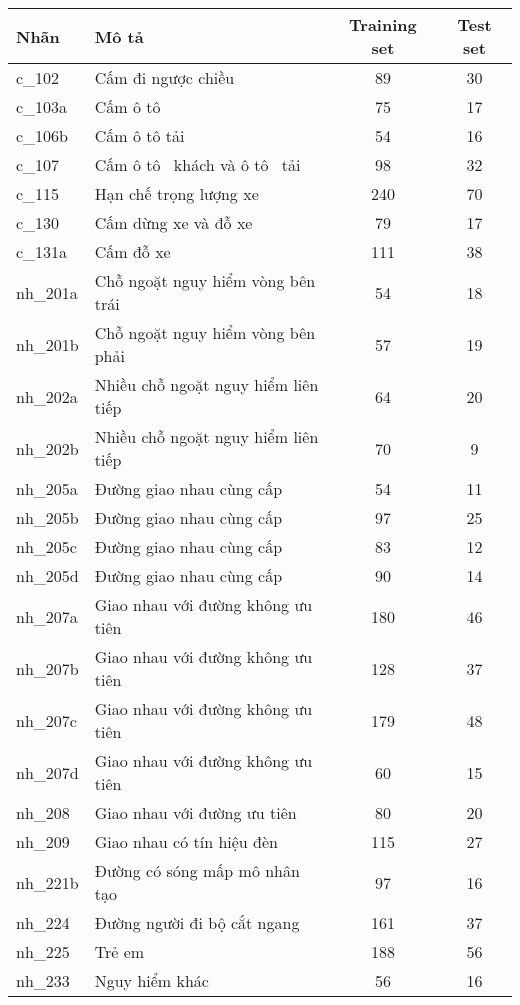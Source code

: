 \documentclass[../thesis.tex]{subfiles}
\begin{document}
\begin{table}[!htb]
\begin{longtable}{| l | l | c | c |}
	\hline
	Nhãn & Mô tả & Training set & Test set\\
	\hline
	c\_102 & Cấm đi ngược chiều & 89 & 30\\
	\hline
	c\_103a & Cấm ô tô & 75 & 17\\
	\hline
	c\_106b & Cấm ô tô tải & 54 & 16\\
	\hline
	c\_107 & Cấm ô tô  khách và ô tô  tải & 98 & 32\\
	\hline
	c\_115 & Hạn chế trọng lượng xe & 240 & 70\\
	\hline
	c\_130 & Cấm dừng xe và đỗ xe & 79 & 17\\
	\hline
	c\_131a & Cấm đỗ xe & 111 & 38\\
	\hline
	nh\_201a & Chỗ ngoặt nguy hiểm vòng bên trái & 54 & 18\\
	\hline
	nh\_201b & Chỗ ngoặt nguy hiểm vòng bên phải & 57 & 19\\
	\hline
	nh\_202a & Nhiều chỗ ngoặt nguy hiểm liên tiếp & 64 & 20\\
	\hline
	nh\_202b & Nhiều chỗ ngoặt nguy hiểm liên tiếp & 70 & 9\\
	\hline
	nh\_205a & Đường giao nhau cùng cấp & 54 & 11\\
	\hline
	nh\_205b & Đường giao nhau cùng cấp & 97 & 25\\
	\hline
	nh\_205c & Đường giao nhau cùng cấp & 83 & 12\\
	\hline
	nh\_205d & Đường giao nhau cùng cấp & 90 & 14\\
	\hline
	nh\_207a & Giao nhau với đường không ưu tiên & 180 & 46\\
	\hline
	nh\_207b & Giao nhau với đường không ưu tiên & 128 & 37\\
	\hline
	nh\_207c & Giao nhau với đường không ưu tiên & 179 & 48\\
	\hline
	nh\_207d & Giao nhau với đường không ưu tiên & 60 & 15\\
	\hline
	nh\_208 & Giao nhau với đường ưu tiên & 80 & 20\\
	\hline
	nh\_209 & Giao nhau có tín hiệu đèn & 115 & 27\\
	\hline
	nh\_221b & Đường có sóng mấp mô nhân tạo & 97 & 16\\
	\hline
	nh\_224 & Đường người đi bộ cắt ngang & 161 & 37\\
	\hline
	nh\_225 & Trẻ em & 188 & 56\\
	\hline
	nh\_233 & Nguy hiểm khác & 56 & 16\\

\end{longtable}
\end{table}
\end{document}
